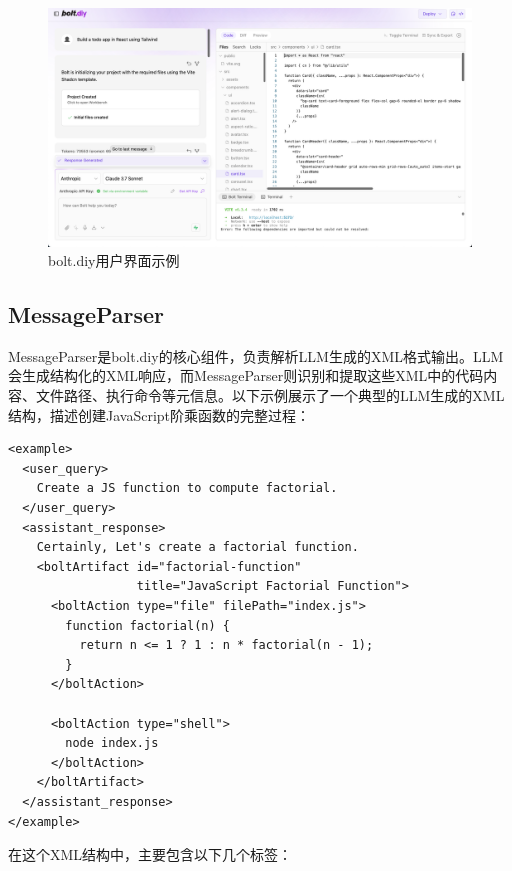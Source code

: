 \begin{figure}[H]
  \centering
  \includegraphics[width=\textwidth]{figures/bolt-diy-example.png}
  \caption{bolt.diy用户界面示例}
  \label{fig:bolt_diy_example}
\end{figure}

\subsection{MessageParser}

MessageParser是bolt.diy的核心组件，负责解析LLM生成的XML格式输出。LLM会生成结构化的XML响应，而MessageParser则识别和提取这些XML中的代码内容、文件路径、执行命令等元信息。以下示例展示了一个典型的LLM生成的XML结构，描述创建JavaScript阶乘函数的完整过程：

\begin{verbatim}
<example>
  <user_query>
    Create a JS function to compute factorial.
  </user_query>
  <assistant_response>
    Certainly, Let's create a factorial function.
    <boltArtifact id="factorial-function" 
                  title="JavaScript Factorial Function">
      <boltAction type="file" filePath="index.js">
        function factorial(n) {
          return n <= 1 ? 1 : n * factorial(n - 1);
        }
      </boltAction>

      <boltAction type="shell">
        node index.js
      </boltAction>
    </boltArtifact>
  </assistant_response>
</example>
\end{verbatim}

在这个XML结构中，主要包含以下几个标签：

